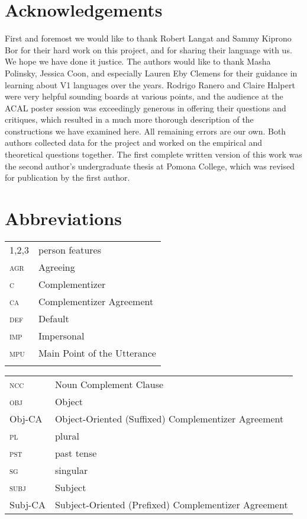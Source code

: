 \documentclass[output=paper,newtxmath,modfonts,nonflat,hidelinks]{langsci/langscibook}
\begin{document}
\section*{Acknowledgements}
First and foremost we would like to thank Robert Langat and Sammy Kiprono Bor for their hard work on this project, and for sharing their language with us. We hope we have done it justice. The authors would like to thank Masha Polinsky, Jessica Coon, and especially Lauren Eby Clemens for their guidance in learning about V1 languages over the years. Rodrigo Ranero and Claire Halpert were very helpful sounding boards at various points, and the audience at the ACAL poster session was exceedingly generous in offering their questions and critiques, which resulted in a much more thorough description of the constructions we have examined here. All remaining errors are our own. Both authors collected data for the project and worked on the empirical and theoretical questions together. The first complete written version of this work was the second author's undergraduate thesis at Pomona College, which was revised for publication by the first author. 

 

\section*{Abbreviations}
 
 
 
 \begin{tabularx}{.45\textwidth}{lQ}
   1,2,3 & person features  \\
   \textsc{agr} & Agreeing \\
   \textsc{c} & Complementizer \\
   \textsc{ca} & Complementizer Agreement \\
   \textsc{def} & Default \\
   \textsc{imp} & Impersonal \\ 
   \textsc{mpu} & Main Point of the Utterance \\  
   \\
 \end{tabularx}
 \begin{tabularx}{.54\textwidth}{lQ}
   \textsc{ncc} & Noun Complement Clause \\   
   \textsc{obj} & Object \\
   Obj-CA & Object-Oriented (Suffixed) Complementizer Agreement \\
   \textsc{pl} & plural \\
   \textsc{pst} &  {past tense} \\
   \textsc{sg} & singular \\
   \textsc{subj} & Subject \\
   Subj-CA & Subject-Oriented (Prefixed) Complementizer Agreement \\
 \end{tabularx} 

\sloppy
\printbibliography[heading=subbibliography,notkeyword=this]
\end{document}
